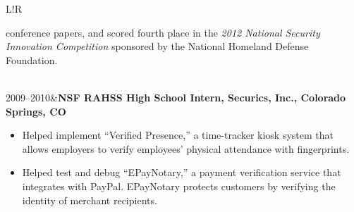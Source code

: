 \documentclass[10pt,letterpaper]{article}
\newcommand\VRule{\color{lightgray}\vrule width 0.5pt}
\begin{document}
\begin{longtable}{L!{\VRule}R}
\begin{itemize}
  conference papers, and scored fourth place in the \emph{2012 National
    Security Innovation Competition} sponsored by the National
  Homeland Defense Foundation.
\vspace{-5pt}
\end{itemize}
\\
2009--2010&\textbf{NSF RAHSS High School Intern, Securics, Inc.,
  Colorado Springs, CO}
\begin{itemize}
\item Helped implement ``Verified Presence,'' a time-tracker
  kiosk system that allows employers to verify employees' physical
  attendance with fingerprints.
\item Helped test and debug ``EPayNotary,'' a payment verification
  service that integrates with PayPal. EPayNotary protects customers
  by verifying the identity of merchant recipients.
\vspace{-5pt}
\end{itemize}
\end{longtable}
\end{document}
